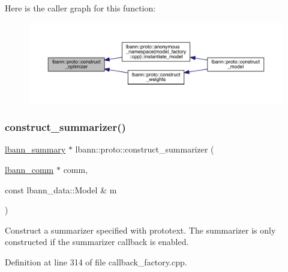 Here is the caller graph for this function\+:\nopagebreak
\begin{figure}[H]
\begin{center}
\leavevmode
\includegraphics[width=350pt]{namespacelbann_1_1proto_af85d2b9f1e986bbab4feccfaa19c9960_icgraph}
\end{center}
\end{figure}
\mbox{\label{namespacelbann_1_1proto_abf0988db9cd58f9ef013588b440c14bd}} 
\subsubsection{\texorpdfstring{construct\+\_\+summarizer()}{construct\_summarizer()}}
{\footnotesize\ttfamily \hyperlink{classlbann_1_1lbann__summary}{lbann\+\_\+summary} $\ast$ lbann\+::proto\+::construct\+\_\+summarizer (\begin{DoxyParamCaption}\item[{\hyperlink{classlbann_1_1lbann__comm}{lbann\+\_\+comm} $\ast$}]{comm,  }\item[{const lbann\+\_\+data\+::\+Model \&}]{m }\end{DoxyParamCaption})}

Construct a summarizer specified with prototext. The summarizer is only constructed if the summarizer callback is enabled. 

Definition at line 314 of file callback\+\_\+factory.\+cpp.


